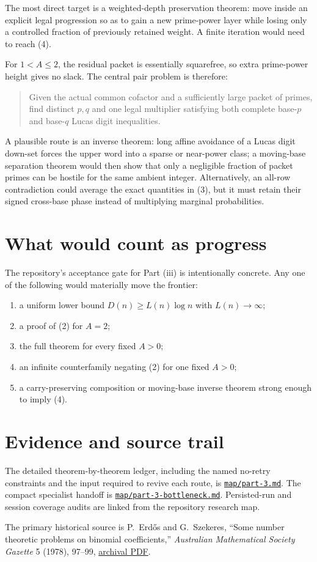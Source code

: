 \documentclass[11pt]{article}
\begin{document}
The most direct target is a weighted-depth preservation theorem: move inside
an explicit legal progression so as to gain a new prime-power layer while
losing only a controlled fraction of previously retained weight.  A finite
iteration would need to reach (4).

For $1<A\leq2$, the residual packet is essentially squarefree, so extra
prime-power height gives no slack.  The central pair problem is therefore:

\begin{quote}
Given the actual common cofactor and a sufficiently large packet of primes,
find distinct $p,q$ and one legal multiplier satisfying both complete
base-$p$ and base-$q$ Lucas digit inequalities.
\end{quote}

A plausible route is an inverse theorem: long affine avoidance of a Lucas
digit down-set forces the upper word into a sparse or near-power class; a
moving-base separation theorem would then show that only a negligible
fraction of packet primes can be hostile for the same ambient integer.
Alternatively, an all-row contradiction could average the exact quantities
in (3), but it must retain their signed cross-base phase instead of multiplying
marginal probabilities.

\section{What would count as progress}

The repository's acceptance gate for Part (iii) is intentionally concrete.
Any one of the following would materially move the frontier:
\begin{enumerate}
\item a uniform lower bound $D(n)\geq L(n)\log n$ with $L(n)\to\infty$;
\item a proof of (2) for $A=2$;
\item the full theorem for every fixed $A>0$;
\item an infinite counterfamily negating (2) for one fixed $A>0$;
\item a carry-preserving composition or moving-base inverse theorem strong
enough to imply (4).
\end{enumerate}

\section{Evidence and source trail}

The detailed theorem-by-theorem ledger, including the named no-retry
constraints and the input required to revive each route, is
\href{https://github.com/gakonst/nanocodex-erdos700/blob/main/map/part-3.md}
{\texttt{map/part-3.md}}.  The compact specialist handoff is
\href{https://github.com/gakonst/nanocodex-erdos700/blob/main/map/part-3-bottleneck.md}
{\texttt{map/part-3-bottleneck.md}}.  Persisted-run and session
coverage audits are linked from the repository research map.

The primary historical source is P.~Erd\H{o}s and G.~Szekeres,
``Some number theoretic problems on binomial coefficients,''
\emph{Australian Mathematical Society Gazette} 5 (1978), 97--99,
\href{https://www.renyi.hu/~p_erdos/1978-46.pdf}{archival PDF}.
\end{document}
